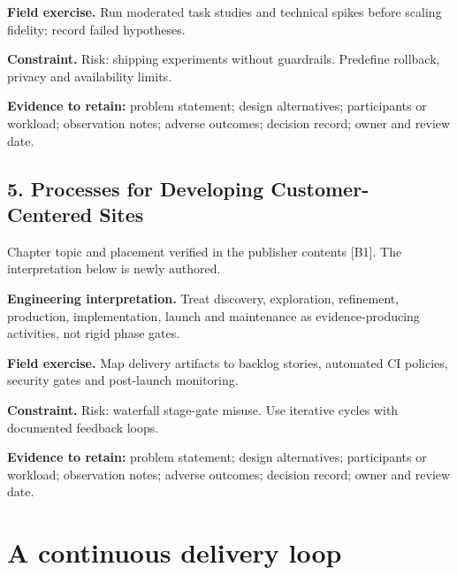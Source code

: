 \documentclass[11pt]{article}
\begin{document}
\textbf{Field exercise.} Run moderated task studies and technical spikes before scaling fidelity; record failed hypotheses.

\textbf{Constraint.} Risk: shipping experiments without guardrails. Predefine rollback, privacy and availability limits.

\textbf{Evidence to retain:} problem statement; design alternatives; participants or workload; observation notes; adverse outcomes; decision record; owner and review date.

\subsection{5. Processes for Developing Customer-Centered Sites}
\begin{groundedbox}Chapter topic and placement verified in the publisher contents [B1]. The interpretation below is newly authored.\end{groundedbox}
\textbf{Engineering interpretation.} Treat discovery, exploration, refinement, production, implementation, launch and maintenance as evidence-producing activities, not rigid phase gates.

\textbf{Field exercise.} Map delivery artifacts to backlog stories, automated CI policies, security gates and post-launch monitoring.

\textbf{Constraint.} Risk: waterfall stage-gate misuse. Use iterative cycles with documented feedback loops.

\textbf{Evidence to retain:} problem statement; design alternatives; participants or workload; observation notes; adverse outcomes; decision record; owner and review date.

\section{A continuous delivery loop}
\end{document}

